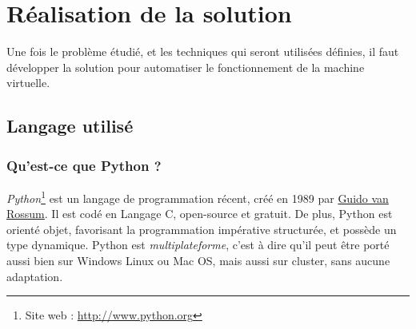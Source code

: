 \cleardoublepage



\chapter{Réalisation de la solution}

Une fois le problème étudié, et les techniques qui seront utilisées définies, il faut développer la solution pour automatiser le fonctionnement de la machine virtuelle.
\\






\section{Langage utilisé}


\subsection{Qu'est-ce que Python ?}

\textit{Python}\footnote{Site web : \href{http://www.python.org}{http://www.python.org}} est un langage de programmation récent, créé en 1989 par \href{http://fr.wikipedia.org/wiki/Guido_van_Rossum}{Guido van Rossum}.
Il est codé en Langage C, open-source et gratuit.
De plus, Python est orienté objet, favorisant la programmation impérative structurée, et possède un type dynamique.
Python est \textit{multiplateforme}, c'est à dire qu'il peut être porté aussi bien sur Windows Linux ou Mac OS, mais aussi sur cluster, sans aucune adaptation.
\\


